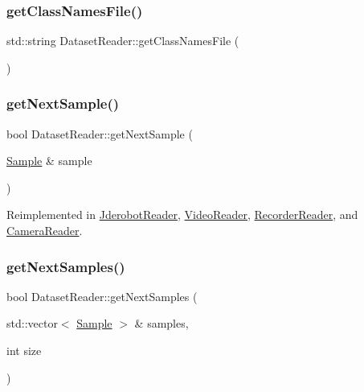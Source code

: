 \mbox{\label{class_dataset_reader_a2838c12e627e42e8394fd18011afa203}} 
\subsubsection{\texorpdfstring{get\+Class\+Names\+File()}{getClassNamesFile()}}
{\footnotesize\ttfamily std\+::string Dataset\+Reader\+::get\+Class\+Names\+File (\begin{DoxyParamCaption}{ }\end{DoxyParamCaption})}

\mbox{\label{class_dataset_reader_af50668f52c34f4620c44e91f26dd11ce}} 
\subsubsection{\texorpdfstring{get\+Next\+Sample()}{getNextSample()}}
{\footnotesize\ttfamily bool Dataset\+Reader\+::get\+Next\+Sample (\begin{DoxyParamCaption}\item[{\hyperlink{struct_sample}{Sample} \&}]{sample }\end{DoxyParamCaption})\hspace{0.3cm}{\ttfamily [virtual]}}



Reimplemented in \hyperlink{class_jderobot_reader_aef97b473c11e144fcf07e01c3181269b}{Jderobot\+Reader}, \hyperlink{class_video_reader_ae2b1921c337b9e2543616017dbd551a7}{Video\+Reader}, \hyperlink{class_recorder_reader_afc52cde597201a1838e6e31b8c801941}{Recorder\+Reader}, and \hyperlink{class_camera_reader_a1b78cca892789abc2294d56afab3146d}{Camera\+Reader}.

\mbox{\label{class_dataset_reader_a4875a59f33227329ca93241add8370c0}} 
\subsubsection{\texorpdfstring{get\+Next\+Samples()}{getNextSamples()}}
{\footnotesize\ttfamily bool Dataset\+Reader\+::get\+Next\+Samples (\begin{DoxyParamCaption}\item[{std\+::vector$<$ \hyperlink{struct_sample}{Sample} $>$ \&}]{samples,  }\item[{int}]{size }\end{DoxyParamCaption})\hspace{0.3cm}{\ttfamily [virtual]}}

